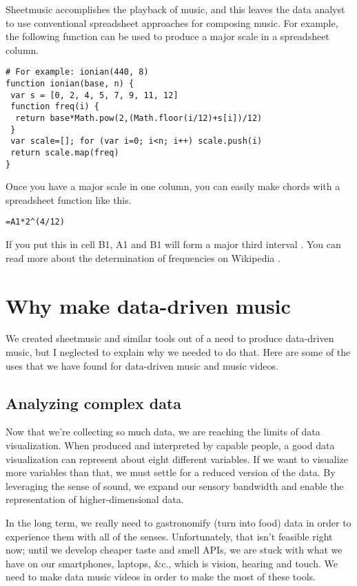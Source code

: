 \documentclass{acm_proc_article-sp}
\begin{document}
Sheetmusic accomplishes the playback of music, and this leaves
the data analyst to use conventional spreadsheet approaches for
composing music. For example, the following function can be used
to produce a major scale in a spreadsheet column.
\begin{verbatim}
# For example: ionian(440, 8)
function ionian(base, n) {
 var s = [0, 2, 4, 5, 7, 9, 11, 12]
 function freq(i) {
  return base*Math.pow(2,(Math.floor(i/12)+s[i])/12)
 }
 var scale=[]; for (var i=0; i<n; i++) scale.push(i)
 return scale.map(freq)
}
\end{verbatim}
Once you have a major scale in one column, you can easily make
chords with a spreadsheet function like this.
\begin{verbatim}
=A1*2^(4/12)
\end{verbatim}
If you put this in cell B1, A1 and B1 will form a major third interval
\cite{majorthird}.
You can read more about the determination of frequencies on Wikipedia \cite{piano}.

\section{Why make data-driven music}
We created sheetmusic and similar tools out of a need to produce
data-driven music, but I neglected to explain why we needed to do
that. Here are some of the uses that we have found for data-driven
music and music videos.

\subsection{Analyzing complex data}
Now that we're collecting so much data, we are reaching the limits of
data visualization. When produced and interpreted by capable people,
a good data visualization can represent about eight different variables.
If we want to visualize more variables than that, we must settle for
a reduced version of the data. By leveraging the sense of sound,
we expand our sensory bandwidth and enable the representation of
higher-dimensional data.

In the long term, we really need to gastronomify (turn into food)
data in order to experience them with all of the senses.
Unfortunately, that isn't feasible right now;
until we develop cheaper taste and smell APIs, we are stuck with what we have
on our smartphones, laptops, \&c., which is vision, hearing and touch. We need
to make data music videos in order to make the most of these tools.
\end{document}
